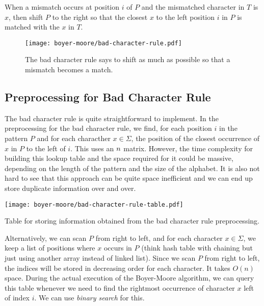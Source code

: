 \begin{rules} 
    \normalfont
    When a mismatch occurs at position $i$ of $P$ and the mismatched character in $T$ is $x$, then shift $P$ to the right so that the closest $x$ to the left position $i$ in $P$ is matched with the $x$ in $T$.
\end{rules}

\begin{figure}[htbp]
    \centering
    \texttt{[image: boyer-moore/bad-character-rule.pdf]}
    \caption{The bad character rule says to shift as much as possible so that a mismatch becomes a match.}
    \label{fig:boyer-moore-bad-char-rule}
\end{figure}

\subsection{Preprocessing for Bad Character Rule}

The bad character rule is quite straightforward to implement. In the preprocessing for the bad character rule, we find, for each position $i$ in the pattern $P$ and for each characther $x \in \Sigma$, the position of the closest occurrence of $x$ in $P$ to the left of $i$. This uses an $n \time \Sigma$ matrix. However, the time complexity for building this lookup table and the space required for it could be massive, depending on the length of the pattern and the size of the alphabet. It is also not hard to see that this approach can be quite space inefficient and we can end up store duplicate information over and over.

\begin{marginfigure}
    \texttt{[image: boyer-moore/bad-character-rule-table.pdf]}

    \hfill
    
    \caption{Table for storing information obtained from the bad character rule preprocessing.}
    \label{fig:bad-character-rule-table}
\end{marginfigure}

Alternatively, we can scan $P$ from right to left, and for each character $x \in \Sigma$, we keep a list of positions where $x$ occurs in $P$ (think hash table with chaining but just using another array instead of linked list). Since we scan $P$ from right to left, the indices will be stored in decreasing order for each character. It takes $O(n)$ space. During the actual execution of the Boyer-Moore algorithm, we can query this table whenever we need to find the rightmost occurrence of character $x$ left of index $i$. We can use \textit{binary search} for this.

